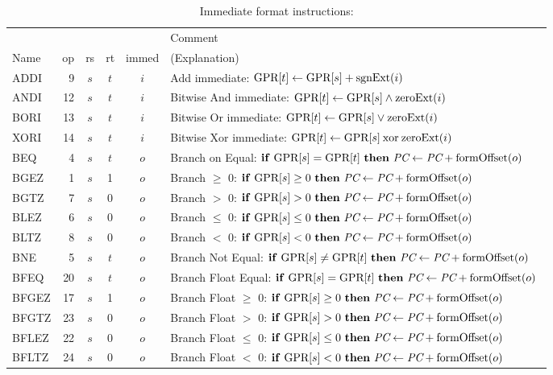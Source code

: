 \documentclass[11pt,letterpaper]{article}
\newcommand{\IFO}[2]{\textrm{\textbf{if} \ensuremath{#1} \textbf{then} \ensuremath{#2} }}
\begin{document}
\begin{table}[htbp]
\caption{Immediate format instructions:}
\label{tab:immedinstrs}  
\begin{tabular}{|l|r|c|c|c|p{11cm}|}
\hline
~    &      & ~  & ~  & ~     & Comment \\
Name & op   & rs & rt & immed & (Explanation) \\
\hline
ADDI  & 9   &$s$ &$t$ & $i$ & Add immediate: $\textrm{GPR[}t\textrm{]} \leftarrow \textrm{GPR[}s\textrm{]} + \textrm{sgnExt}(i)$ \\
\hline
ANDI & 12    &$s$ &$t$ & $i$ & Bitwise And immediate: $\textrm{GPR[}t\textrm{]} \leftarrow \textrm{GPR[}s\textrm{]} \wedge \textrm{zeroExt}(i)$ \\
\hline
BORI & 13    &$s$ &$t$ & $i$ & Bitwise Or immediate: $\textrm{GPR[}t\textrm{]} \leftarrow \textrm{GPR[}s\textrm{]} \vee \textrm{zeroExt}(i)$ \\
\hline
XORI & 14    &$s$ &$t$ & $i$ & Bitwise Xor immediate: $\textrm{GPR[}t\textrm{]} \leftarrow \textrm{GPR[}s\textrm{]} \:\textrm{xor}\: \textrm{zeroExt}(i)$ \\
\hline
BEQ & 4     &$s$ &$t$ & $o$ & Branch on Equal: $\IFO{\GPR{s} = \GPR{t}}{\PC \GETS \PC + \FORMOFFSET{o}}$ \\
\hline
BGEZ & 1    &$s$ & 1  & $o$ & Branch $\geq$ 0: $\IFO{\GPR{s} \geq 0}{\PC \GETS \PC + \FORMOFFSET{o}}$ \\
\hline
BGTZ & 7    &$s$ & 0  & $o$ & Branch $>$ 0: $\IFO{\GPR{s} > 0}{\PC \GETS \PC + \FORMOFFSET{o}}$ \\
\hline
BLEZ & 6    &$s$ & 0  & $o$ & Branch $\leq$ 0: $\IFO{\GPR{s} \leq 0}{\PC \GETS \PC + \FORMOFFSET{o}}$ \\
\hline
BLTZ & 8    &$s$ & 0  & $o$ & Branch $<$ 0: $\IFO{\GPR{s} < 0}{\PC \GETS \PC + \FORMOFFSET{o}}$ \\
\hline
BNE  & 5    &$s$ &$t$ & $o$ & Branch Not Equal: $\IFO{\GPR{s} \neq \GPR{t}}{\PC \GETS \PC + \FORMOFFSET{o}}$ \\
\hline
BFEQ & 20     &$s$ &$t$ & $o$ & Branch Float Equal: $\IFO{\GPR{s} = \GPR{t}}{\PC \GETS \PC + \FORMOFFSET{o}}$ \\
\hline
BFGEZ & 17    &$s$ & 1  & $o$ & Branch Float $\geq$ 0: $\IFO{\GPR{s} \geq 0}{\PC \GETS \PC + \FORMOFFSET{o}}$ \\
\hline
BFGTZ & 23    &$s$ & 0  & $o$ & Branch Float $>$ 0: $\IFO{\GPR{s} > 0}{\PC \GETS \PC + \FORMOFFSET{o}}$ \\
\hline
BFLEZ & 22    &$s$ & 0  & $o$ & Branch Float $\leq$ 0: $\IFO{\GPR{s} \leq 0}{\PC \GETS \PC + \FORMOFFSET{o}}$ \\
\hline
BFLTZ & 24    &$s$ & 0  & $o$ & Branch Float $<$ 0: $\IFO{\GPR{s} < 0}{\PC \GETS \PC + \FORMOFFSET{o}}$ \\

\end{tabular}
\end{table}
\end{document}
